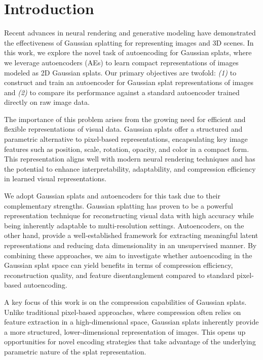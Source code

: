 \section{Introduction}
\label{sec:introduction}

Recent advances in neural rendering and generative modeling have demonstrated the effectiveness of 	Gaussian splatting for representing images and 3D scenes. In this work, we explore the novel task of 	autoencoding for Gaussian splats, where we leverage autoencoders (AEs) to learn compact representations of images modeled as 2D Gaussian splats. Our primary objectives are twofold: \textit{(1)} to construct and train an autoencoder for Gaussian splat representations of images and \textit{(2)} to compare its performance against a standard autoencoder trained directly on raw image data. 

The importance of this problem arises from the growing need for efficient and flexible representations of visual data. Gaussian splats offer a structured and parametric alternative to pixel-based representations, encapsulating key image features such as position, scale, rotation, opacity, and color in a compact form. This representation aligns well with modern neural rendering techniques and has the potential to enhance interpretability, adaptability, and compression efficiency in learned visual representations.

We adopt Gaussian splats and autoencoders for this task due to their complementary strengths. Gaussian splatting has proven to be a powerful representation technique for reconstructing visual data with high accuracy while being inherently adaptable to multi-resolution settings. Autoencoders, on the other hand, provide a well-established framework for extracting meaningful latent representations and reducing data dimensionality in an unsupervised manner. By combining these approaches, we aim to investigate whether autoencoding in the Gaussian splat space can yield benefits in terms of compression efficiency, reconstruction quality, and feature disentanglement compared to standard pixel-based autoencoding.

A key focus of this work is on the compression capabilities of Gaussian splats. Unlike traditional pixel-based approaches, where compression often relies on feature extraction in a high-dimensional space, Gaussian splats inherently provide a more structured, lower-dimensional representation of images. This opens up opportunities for novel encoding strategies that take advantage of the underlying parametric nature of the splat representation.

